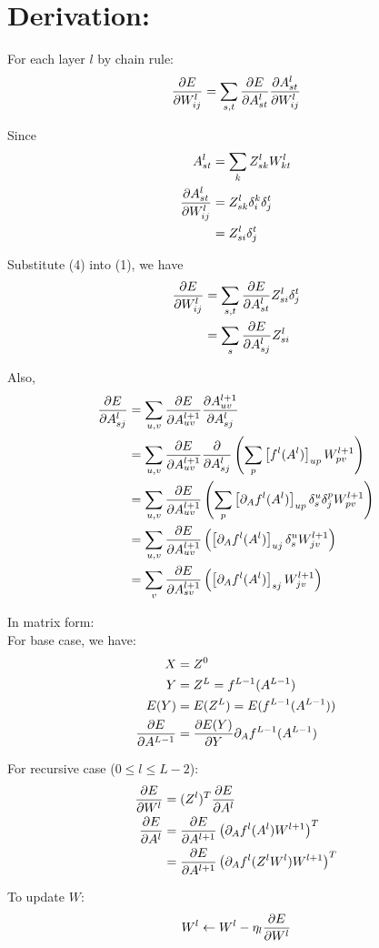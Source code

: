 \documentclass[14pt,letter,oneside]{article}
\begin{document}
	 \section*{Derivation:}
	 For each layer $l$ by chain rule:
	 \begin{align}
	   \pdv{E}{W^{l}_{ij}} = \sum_{s,t} \pdv{E}{A^l_{st}} \pdv{A^l_{st}}{W^{l}_{ij}}
	 \end{align}
	 
	 Since \begin{align}
		A^l_{st} &= \sum_k Z^l_{sk}W^l_{kt} \\
		\pdv{A^l_{st}}{W^l_{ij}} &= Z^l_{sk} \delta^k_i \delta^t_j \\
		 &= Z^l_{si} \delta^t_j
	 \end{align} 
	 
	 Substitute (4) into (1), we have 
	 \begin{align}
		 \pdv{E}{W^{l}_{ij}} &= \sum_{s,t} \pdv{E}{A^l_{st}}  Z^l_{si} \delta^t_j \\
		 &= \sum_{s} \pdv{E}{A^l_{sj}}  Z^l_{si}
	 \end{align}
	 
	 
	 Also,
	 \begin{align}
		  \pdv{E}{A^l_{sj}} &= \sum_{u,v} \pdv{E}{A^{l+1}_{uv}} \pdv{A^{l+1}_{uv}}{A^l_{sj}} \\
		  &= \sum_{u,v} \pdv{E}{A^{l+1}_{uv}} \pdv{}{A^l_{sj}} \left(\sum_p \left[f^l(A^l)\right]_{up}W^{l+1}_{pv} \right)  \\
		  &= \sum_{u,v} \pdv{E}{A^{l+1}_{uv}} \left(\sum_p \left[\partial_Af^l(A^l)\right]_{up} \delta^u_s \delta^p_j W^{l+1}_{pv} \right)  \\
		 &= \sum_{u,v} \pdv{E}{A^{l+1}_{uv}} \left(\left[\partial_Af^l(A^l)\right]_{uj} \delta^u_s W^{l+1}_{jv} \right)  \\
		 &= \sum_{v} \pdv{E}{A^{l+1}_{sv}} \left(\left[\partial_Af^l(A^l)\right]_{sj} W^{l+1}_{jv} \right) 
	 \end{align}
	 
	 In matrix form: \\

	 
	 For base case, we have:
	   \begin{align}
	   		X &= Z^0 \\
	   		Y &= Z^L = f^{L-1}(A^{L-1})  \\
	   		E(Y) &= E(Z^L) = E(f^{L-1}(A^{L-1})) \\
	   		\pdv{E}{A^{L-1}} &= \pdv{E(Y)}{Y}\partial_A f^{L-1}(A^{L-1}) 
	   \end{align}
	   
	 For recursive case ($0 \leq l \leq L-2$):
	   \begin{align}
	    	\pdv{E}{W^l} &= (Z^l)^T \pdv{E}{A^l} \\
	    	\pdv{E}{A^l} &= \pdv{E}{A^{l+1}} \left( \partial_Af^l(A^l) W^{l+1} \right)^T \\
	    	&= \pdv{E}{A^{l+1}} \left( \partial_Af^l(Z^lW^l) W^{l+1} \right)^T
	   \end{align}
	
	 To update $W$:
	   $$ W^l \leftarrow W^l - \eta_l \pdv{E}{W^l} $$
	
\end{document}
